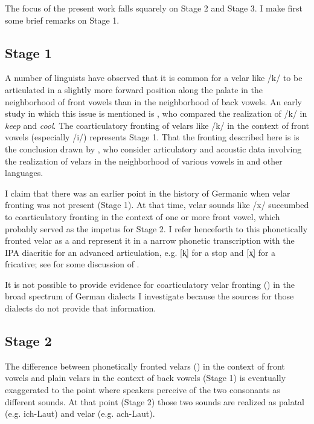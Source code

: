 \begin{xlist}
\begin{xlist}
The focus of the present work falls squarely on Stage 2 and Stage 3. I make first some brief remarks on Stage 1.

\subsection{Stage 1}

A number of linguists have observed that it is common for a velar like /k/ to be articulated in a slightly more forward position along the palate in the neighborhood of front vowels than in the neighborhood of back vowels. An early study in which this issue is mentioned is \citet[52]{Sapir1921}, who compared the realization of  /k/ in \textit{keep} and \textit{cool}. The coarticulatory fronting of velars like /k/ in the context of front vowels (especially /i/) represents Stage 1. That the fronting described here is  is the conclusion drawn by \citet{KeatingLahiri1993}, who consider articulatory and acoustic data involving the realization of velars in the neighborhood of various vowels in  and other languages.

I claim that there was an earlier point in the history of Germanic when velar fronting was not present (Stage 1). At that time, velar sounds like /x/ succumbed to coarticulatory fronting in the context of one or more front vowel, which probably served as the impetus for Stage 2. I refer henceforth to this phonetically fronted velar as a \textsc{} and represent it in a narrow phonetic transcription with the IPA diacritic for an advanced articulation, e.g. [k̟] for a  stop and [x̟] for a  fricative; see  for some discussion of .

It is not possible to provide evidence for coarticulatory velar fronting () in the broad spectrum of German dialects I investigate because the sources for those dialects do not provide that information.

\subsection{Stage 2}\label{sec:2.5.2}

The difference between phonetically fronted velars () in the context of front vowels and plain velars in the context of back vowels (Stage 1) is eventually exaggerated to the point where speakers perceive of the two consonants as different sounds. At that point (Stage 2) those two sounds are realized as palatal (e.g. ich-Laut) and velar (e.g. ach{}-Laut).


\end{xlist}
\end{xlist}
